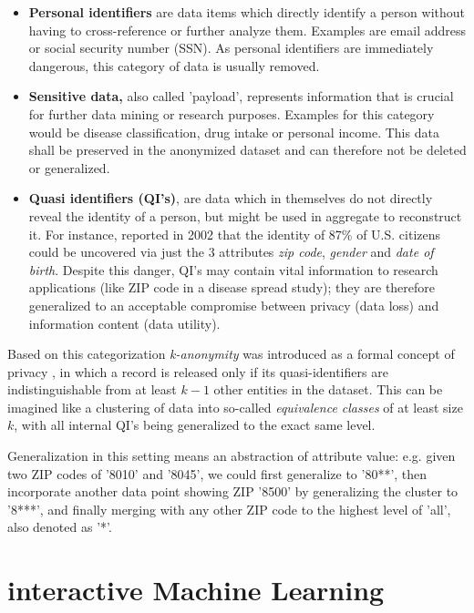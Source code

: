 \documentclass{llncs}
\begin{document}
\begin{itemize}
	\item \textbf{Personal identifiers} are data items which directly identify a person without having to cross-reference or further analyze them. Examples are email address or social security number (SSN). As personal identifiers are immediately dangerous, this category of data is usually removed.
	\item \textbf{Sensitive data,} also called 'payload', represents information that is crucial for further data mining or research purposes. Examples for this category would be disease classification, drug intake or personal income. This data shall be preserved in the anonymized dataset and can therefore not be deleted or generalized.
	\item \textbf{Quasi identifiers (QI's)}, are data which in themselves do not directly reveal the identity of a person, but might be used in aggregate to reconstruct it. For instance, \cite{sweeney2002k} reported in 2002 that the identity of 87\% of U.S. citizens could be uncovered via just the 3 attributes \textit{zip code}, \textit{gender} and \textit{date of birth}. Despite this danger, QI's may contain vital information to research applications (like ZIP code in a disease spread study); they are therefore generalized to an acceptable compromise between privacy (data loss) and information content (data utility).
\end{itemize}

Based on this categorization \textit{k-anonymity} \cite{Samarati:2001:kAnonymity} was introduced as a formal concept of privacy , in which a record is released only if its quasi-identifiers are indistinguishable from at least $k-1$ other entities in the dataset. This can be imagined like a clustering of data into so-called \textit{equivalence classes} of at least size $k$, with all internal QI's being generalized to the exact same level.

Generalization in this setting means an abstraction of attribute value: e.g. given two ZIP codes of '8010' and '8045', we could first generalize to '80**', then incorporate another data point showing ZIP '8500' by generalizing the cluster to '8***', and finally merging with any other ZIP code to the highest level of 'all', also denoted as '*'.


\section{interactive Machine Learning}
\label{sect:iML}
\end{document}
